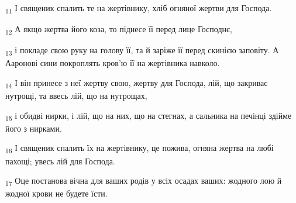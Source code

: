 \begin{tcolorbox}
\textsubscript{11} І священик спалить те на жертівнику, хліб огняної жертви для Господа.
\end{tcolorbox}
\begin{tcolorbox}
\textsubscript{12} А якщо жертва його коза, то піднесе її перед лице Господнє,
\end{tcolorbox}
\begin{tcolorbox}
\textsubscript{13} і покладе свою руку на голову її, та й заріже її перед скинією заповіту. А Ааронові сини покроплять кров'ю її на жертівника навколо.
\end{tcolorbox}
\begin{tcolorbox}
\textsubscript{14} І він принесе з неї жертву свою, жертву для Господа, лій, що закриває нутрощі, та ввесь лій, що на нутрощах,
\end{tcolorbox}
\begin{tcolorbox}
\textsubscript{15} і обидві нирки, і лій, що на них, що на стегнах, а сальника на печінці здійме його з нирками.
\end{tcolorbox}
\begin{tcolorbox}
\textsubscript{16} І священик спалить їх на жертівнику, це пожива, огняна жертва на любі пахощі; увесь лій для Господа.
\end{tcolorbox}
\begin{tcolorbox}
\textsubscript{17} Оце постанова вічна для ваших родів у всіх осадах ваших: жодного лою й жодної крови не будете їсти.
\end{tcolorbox}
